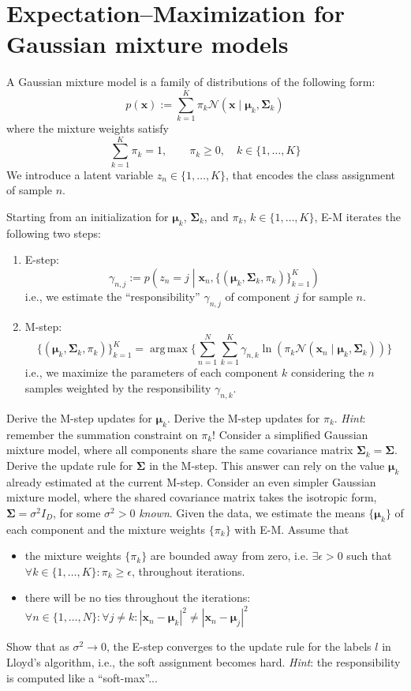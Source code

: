 \documentclass[11pt,noanswers,addpoints]{exam}
\DeclareMathOperator*{\argmax}{arg\,max}
\renewcommand{\boldsymbol}[1]{\pmb{#1}}
\newcommand{\x}{\mathbf x}
\newcommand{\N}{\mathcal N}
\newcommand{\bigmid}{\mathrel{}\middle|\mathrel{}}
\begin{document}
\section{Expectation--Maximization for Gaussian mixture models}
A Gaussian mixture model is a family of distributions of the following form:
$$p(\x) :=\sum_{k=1}^K \pi_k \N(\x\mid\boldsymbol\mu_k,\boldsymbol\Sigma_k)$$
where the mixture weights satisfy
$$\sum_{k=1}^K\pi_k=1,\qquad \pi_k \geq 0, \quad k\in\{1,\ldots,K\}$$
We introduce a latent variable $z_n\in\{1,\ldots,K\}$, that encodes the class assignment of sample $n$. 

Starting from an initialization for $\boldsymbol\mu_k$, $\boldsymbol\Sigma_k$, and $\pi_k$, $k\in\{1,\ldots,K\}$, E-M iterates the following two steps:
\begin{enumerate}
\item E-step: $$\gamma_{n,j} := p\left( z_n = j \bigmid \x_n, \{(\boldsymbol\mu_k, \boldsymbol\Sigma_k, \pi_k )\}_{k=1}^K \right)$$
i.e., we estimate the ``responsibility'' $\gamma_{n,j}$ of component $j$ for sample $n$.
\item M-step: $$\{(\boldsymbol\mu_k, \boldsymbol\Sigma_k, \pi_k )\}_{k=1}^K = \argmax\biggl\{ \sum_{n=1}^N\sum_{k=1}^K \gamma_{n,k}\ln\left(\pi_k\N\left(\x_n\mid \boldsymbol\mu_k,\boldsymbol\Sigma_k\right) \right)  \biggr\}$$
i.e., we maximize the parameters of each component $k$ considering the $n$ samples weighted by the responsibility $\gamma_{n,k}$.
\end{enumerate}
\begin{questions}
\question Derive the M-step updates for $\boldsymbol\mu_k$.
\question Derive the M-step updates for $\pi_k$. \emph{Hint}: remember the summation constraint on $\pi_k$!
\question Consider a simplified Gaussian mixture model, where all components share the same covariance matrix $\boldsymbol\Sigma_k=\boldsymbol\Sigma$. Derive the update rule for $\boldsymbol\Sigma$ in the M-step. This answer can rely on the value $\boldsymbol\mu_k$ already estimated at the current M-step.
\question Consider an even simpler Gaussian mixture model, where the shared covariance matrix takes the isotropic form, $\boldsymbol\Sigma = \sigma^2I_D$, for some $\sigma^2>0$ \emph{known}. Given the data, we estimate the means $\{\boldsymbol\mu_k\}$ of each component and the mixture weights $\{\pi_k\}$ with E-M. Assume that 
\begin{itemize}
\item the mixture weights $\{\pi_k\}$ are bounded away from zero, i.e. $\exists \epsilon>0$ such that $\forall k\in\{1,\ldots,K\}\colon \pi_k\geq \epsilon$, throughout iterations.
\item there will be no ties throughout the iterations: $\forall n\in\{1,\ldots,N\}\colon \forall j\neq k\colon |\x_n-\boldsymbol\mu_k|^2 \neq |\x_n-\boldsymbol\mu_j|^2$
\end{itemize}
Show that as $\sigma^2\to0$, the E-step converges to the update rule for the labels $l$ in Lloyd's algorithm, i.e., the soft assignment becomes hard. \emph{Hint}: the responsibility is computed like a ``soft-max''...
\end{questions}
\end{document}
